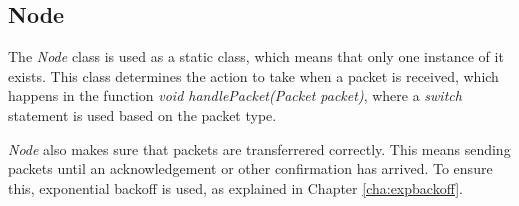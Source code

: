 \subsection{Node}
The \textit{Node} class is used as a static class, which means that only one instance of it exists. This class determines the action to take when a packet is received, which happens in the function \textit{void handlePacket(Packet packet)}, where a \textit{switch} statement is used based on the packet type.

\textit{Node} also makes sure that packets are transferrered correctly. This means sending packets until an acknowledgement or other confirmation has arrived. To ensure this, exponential backoff is used, as explained in Chapter \ref{cha:expbackoff}.

